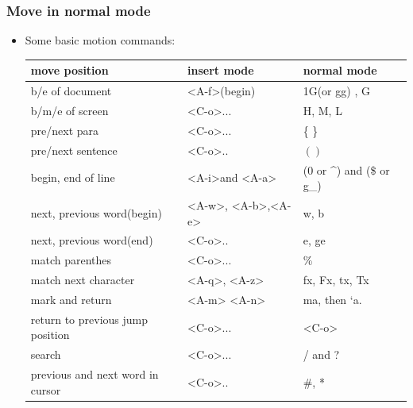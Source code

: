 \documentclass[a4paper,11pt,twoside]{book}
\begin{document}
\subsubsection{Move in normal mode}
	\begin{itemize}

	\item Some basic motion commands: 
	\begin{center}
		\begin{tabular}{|p{}|p{}|p{}|}
		\hline 
        move position & insert mode & normal mode \\

		\hline
		b/e of document &  <A-f>(begin)  & 1G(or gg) , G  \\

	    \hline 
		b/m/e of screen & <C-o>... & H, M, L \\

		\hline 
		pre/next para & <C-o>... &\{ \} \\

		\hline 
		pre/next sentence & <C-o>.. & $( )$ \\
		
		\hline 
		begin, end of line &<A-i>and <A-a> & (0 or \^{}) and (\$ or g\_)  \\
		
	   	\hline 		
		next, previous word(begin) &<A-w>, <A-b>,<A-e>  & w, b\\   

	    \hline
	    next, previous word(end) & <C-o>.. & e, ge \\
 	
         \hline 		
         match parenthes & <C-o>... & \%   \\
         
         \hline 
		 match next character &<A-q>, <A-z>& fx, Fx, tx, Tx \\
         
        \hline  
		mark and return & <A-m> <A-n> & ma, then `a. \\
        
        \hline 
		return to previous jump position & <C-o>... & <C-o> \\    
      				
		\hline
        search &<C-o>...  & / and ? \\

       \hline       
		previous and next word in cursor & <C-o>.. & \#, * \\


\end{tabular}
\end{center}
\end{itemize}
\end{document}
